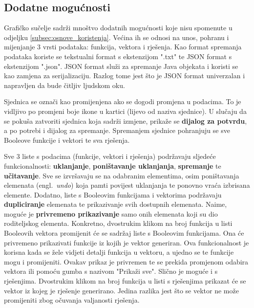\documentclass[times, utf8, diplomski]{fer}
\begin{document}
\subsection{Dodatne mogućnosti} \label{subsec:dodatne_mogucnosti}

Grafičko sučelje sadrži mnoštvo dodatnih mogućnosti koje nisu spomenute u odjeljku \ref{subsec:osnove_koristenja}. Većina ih se odnosi na unos, pohranu i mijenjanje $3$ vrsti podataka: funkcija, vektora i rješenja. Kao format spremanja podataka koriste se tekstualni format s ekstenzijom ".txt" te JSON format s ekstenzijom ".json". JSON format služi za spremanje Java objekata i koristi se kao zamjena za serijalizaciju. Razlog tome jest što je JSON format univerzalan i napravljen da bude čitljiv ljudskom oku.

Sjednica se označi kao promijenjena ako se dogodi promjena u podacima. To je vidljivo po promjeni boje ikone u kartici (lijevo od naziva sjednice). U slučaju da se pokuša zatvoriti sjednica koja sadrži izmjene, prikaže se \textbf{dijalog za potvrdu}, a po potrebi i dijalog za spremanje. Spremanjem sjednice pohranjuju se sve Booleove funkcije i vektori te sva rješenja.

Sve $3$ liste s podacima (funkcije, vektori i rješenja) podržavaju sljedeće funkcionalnosti: \textbf{uklanjanje}, \textbf{poništavanje uklanjanja}, \textbf{spremanje} te \textbf{učitavanje}. Sve se izvršavaju se na odabranim elementima, osim poništavanja elemenata (engl.~\textit{undo}) koja pamti povijest uklanjanja te ponovno vraća izbrisana elemente. Dodatno, liste s Booleovim funkcijama i vektorima podržavaju \textbf{dupliciranje} elemenata te prikazivanje svih dostupnih elemenata. Naime, moguće je \textbf{privremeno prikazivanje} samo onih elemenata koji su dio roditeljskog elementa. Konkretno, dvostrukim klikom na broj funkcija u listi Booleovih vektora promijenit će se sadržaj liste s Booleovim funkcijama. Ona će privremeno prikazivati funkcije iz kojih je vektor generiran. Ova funkcionalnost je korisna kada se žele vidjeti detalji funkcija u vektoru, a ujedno se te funkcije mogu i promijeniti. Ovakav prikaz je privremen te se prekida promjenom odabira vektora ili pomoću gumba s nazivom "Prikaži sve". Slično je moguće i s rješenjima. Dvostrukim klikom na broj funkcija u listi s rješenjima prikazat će se vektor iz kojeg je rješenje generirano. Jedina razlika jest što se vektor ne može promijeniti zbog očuvanja valjanosti rješenja.
\end{document}
